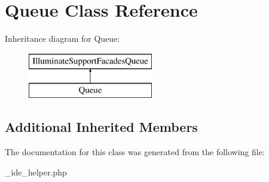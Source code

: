 \hypertarget{class_queue}{}\section{Queue Class Reference}
\label{class_queue}
Inheritance diagram for Queue\+:\begin{figure}[H]
\begin{center}
\leavevmode
\includegraphics[height=2.000000cm]{class_queue}
\end{center}
\end{figure}
\subsection*{Additional Inherited Members}


The documentation for this class was generated from the following file\+:\begin{DoxyCompactItemize}
\item 
\+\_\+ide\+\_\+helper.\+php\end{DoxyCompactItemize}
